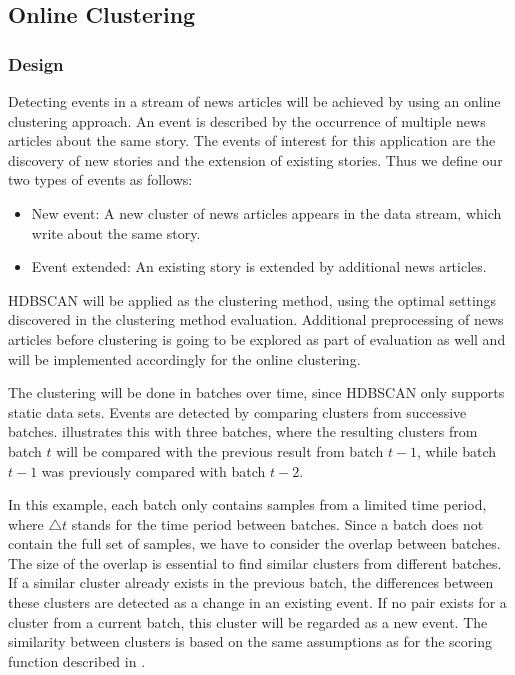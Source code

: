 \subsection{Online Clustering}
\label{subsec:4c_online_clustering}

\subsubsection{Design}
\label{subsubsec:4c_design}

Detecting events in a stream of news articles will be achieved by using an online clustering approach.
An event is described by the occurrence of multiple news articles about the same story.
The events of interest for this application are the discovery of new stories and the extension of existing stories.
Thus we define our two types of events as follows:

\begin{itemize}
    \item New event: A new cluster of news articles appears in the data stream, which write about the same story.
    \item Event extended: An existing story is extended by additional news articles.
\end{itemize}

HDBSCAN will be applied as the clustering method,
using the optimal settings discovered in the clustering method evaluation.
Additional preprocessing of news articles before clustering is going to be explored
as part of evaluation as well and will be implemented accordingly for the online clustering.

The clustering will be done in batches over time, since HDBSCAN only supports static data sets.
Events are detected by comparing clusters from successive batches.
 illustrates this with three batches,
where the resulting clusters from batch $t$ will be compared with the previous result from batch $t - 1$,
while batch $t - 1$ was previously compared with batch $t - 2$.

In this example, each batch only contains samples from a limited time period,
where $\triangle t$ stands for the time period between batches.
Since a batch does not contain the full set of samples, we have to consider the overlap between batches.
The size of the overlap is essential to find similar clusters from different batches.
If a similar cluster already exists in the previous batch,
the differences between these clusters are detected as a change in an existing event.
If no pair exists for a cluster from a current batch, this cluster will be regarded as a new event.
The similarity between clusters is based on the same assumptions
as for the scoring function described in .

